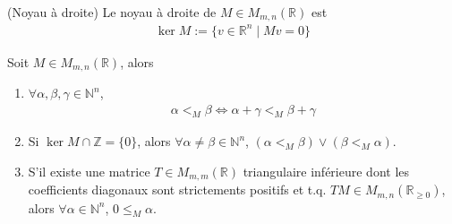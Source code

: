         \begin{defi} (Noyau à droite)
            Le noyau à droite de $M \in M_{m,n}(\mathbb{R})$ est
            \begin{align*}
                \ker M := \{v \in \mathbb{R}^n \mid Mv = 0\}
            \end{align*}
        \end{defi}
        \begin{prop}
            Soit $M \in M_{m,n}(\mathbb{R})$, alors
            \begin{enumerate}
                \item $\forall \alpha, \beta, \gamma \in \mathbb{N}^n$,
                \begin{align*}
                    \alpha <_M \beta \iff \alpha + \gamma <_M \beta + \gamma
                \end{align*}
                \item Si $\ker M \cap \mathbb{Z} = \{0\}$, alors $\forall \alpha \neq \beta \in \mathbb{N}^n$, $(\alpha <_M \beta) \lor (\beta <_M \alpha)$.
                \item S'il existe une matrice $T \in M_{m,m}(\mathbb{R})$ triangulaire inférieure dont les coefficients diagonaux sont strictements positifs et t.q. $TM \in M_{m,n}(\mathbb{R}_{\geq 0})$, alors $\forall \alpha \in \mathbb{N}^n$, $0 \leq_M \alpha$.
            \end{enumerate}
        \end{prop}
